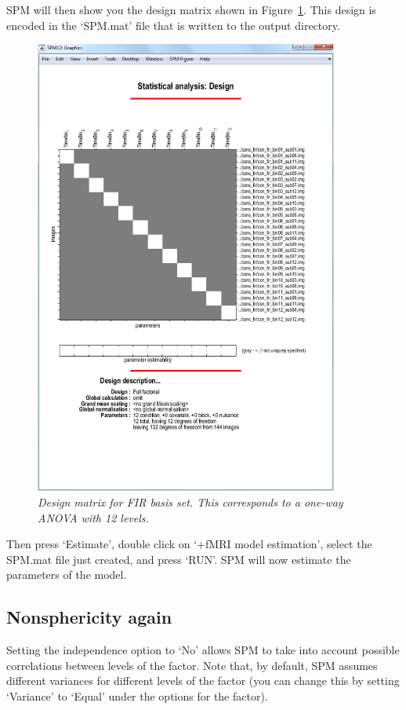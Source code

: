 SPM will then show you the design matrix shown in Figure~\ref{fir_design}. This design is encoded in the `SPM.mat' file that is written to the output directory.
\begin{figure}
\begin{center}
\includegraphics[width=100mm]{faces_group/fir_design}
\caption{\em Design matrix for FIR basis set. This corresponds to a one-way ANOVA with 12 levels. \label{fir_design}}
\end{center}
\end{figure}
Then press `Estimate', double click on `+fMRI model   estimation', select the SPM.mat file just created, and press `RUN'.
SPM will now estimate the parameters of the model.

\subsection{Nonsphericity again}

Setting the independence option to `No' allows SPM to take into account possible correlations between levels of the factor. Note that, by default, SPM assumes different variances 
for different levels of the factor (you can change this by setting `Variance' to `Equal' under the options for the factor). 

